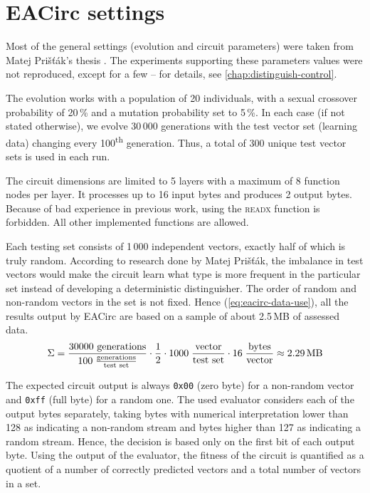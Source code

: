 \documentclass[12pt,oneside]{fithesis2}
\begin{document}
\section{EACirc settings}
\label{sec:settings-eacirc}

Most of the general settings (evolution and circuit parameters) were taken from Matej Prišťák's thesis \parencite{thesis-pristak}. 
The experiments supporting these parameters values were not reproduced, except for a few -- for details,
see \autoref{chap:distinguish-control}.

The evolution works with a population of 20 individuals, with a sexual crossover probability of 20\,\% and a mutation probability
set to 5\,\%. In each case (if not stated otherwise), we evolve 30\,000 generations with the test vector set
(learning data) changing every 100\textsuperscript{th} generation. Thus, a total of 300 unique test vector sets is used in each run.

The circuit dimensions are limited to 5 layers with a maximum of 8 function nodes per layer. It processes up to 16 input bytes
and produces 2 output bytes. Because of bad experience in previous work, using the \textsc{readx} function is forbidden.
All other implemented functions are allowed.

Each testing set consists of 1\,000 independent vectors, exactly half of which is truly random. 
According to research done by Matej Prišťák, the imbalance in test vectors would make the circuit learn what type is more frequent
in the particular set instead of developing a deterministic distinguisher. 
The order of random and non-random vectors in the set is not fixed.
Hence (\autoref{eq:eacirc-data-use}), all the results output by EACirc are based on a sample of about 2.5\,MB of assessed data.
\begin{equation}
\label{eq:eacirc-data-use}
\Sigma = \frac{30000 \text{ generations}}{100 \; \frac{\text{generations}}{\text{test set}}}
         \cdot \frac{1}{2} \cdot 1000 \; \frac{\text{vector}}{\text{test set}}
         \cdot 16 \; \frac{\text{bytes}}{\text{vector}}
         \approx 2.29 \text{\,MB}
\end{equation}

The expected circuit output is always \texttt{0x00} (zero byte) for a non-random vector and \texttt{0xff} (full byte) 
for a random one.
The used evaluator considers each of the output bytes separately, taking bytes with numerical interpretation lower than
128 as indicating a non-random stream and bytes higher than 127 as indicating a random stream.
Hence, the decision is based only on the first bit of each output byte.
Using the output of the evaluator, the fitness of the circuit is quantified as a quotient of a number of 
correctly predicted vectors and a total number of vectors in a set.
\end{document}
